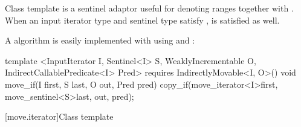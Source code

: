 \begin{addedblock}
\pnum
Class template  is a sentinel adaptor useful for denoting
ranges together with . When an input iterator type
 and sentinel type  satisfy ,
 is satisfied as well.

\pnum
\enterexample A  algorithm is easily implemented with
 using  and :

\begin{codeblock}
template <InputIterator I, Sentinel<I> S, WeaklyIncrementable O,
          IndirectCallablePredicate<I> Pred>
  requires IndirectlyMovable<I, O>()
void move_if(I first, S last, O out, Pred pred)
{
  copy_if(move_iterator<I>{first}, move_sentinel<S>{last}, out, pred);
}
\end{codeblock}

\exitexample
\end{addedblock}

[move.iterator]{Class template }

